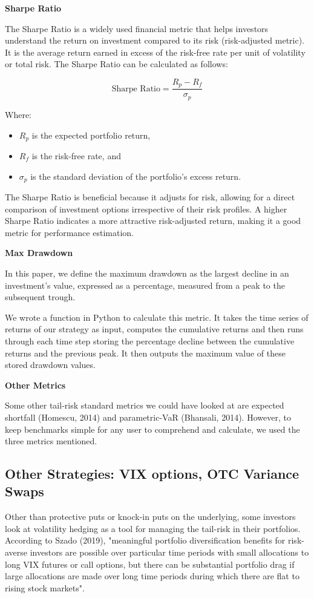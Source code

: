 \documentclass[12pt]{article}
\begin{document}
{{\textbf{Sharpe Ratio}

The Sharpe Ratio is a widely used financial metric that helps investors understand the return on investment compared to its risk (risk-adjusted metric). It is the average return earned in excess of the risk-free rate per unit of volatility or total risk. The Sharpe Ratio can be calculated as follows:

\[
\text{Sharpe Ratio} = \frac{R_p - R_f}{\sigma_p}
\]

Where:
\begin{itemize}
\item $R_p$ is the expected portfolio return,
\item $R_f$ is the risk-free rate, and
\item $\sigma_p$ is the standard deviation of the portfolio's excess return.
\end{itemize}

\qquad The Sharpe Ratio is beneficial because it adjusts for risk, allowing for a direct comparison of investment options irrespective of their risk profiles. A higher Sharpe Ratio indicates a more attractive risk-adjusted return, making it a good metric for performance estimation.

\textbf{Max Drawdown}

In this paper, we define the maximum drawdown as the largest decline in an investment's value, expressed as a percentage, measured from a peak to the subsequent trough.

We wrote a function in Python to calculate this metric. It takes the time series of returns of our strategy as input, computes the cumulative returns and then runs through each time step storing the percentage decline between the cumulative returns and the previous peak. It then outputs the maximum value of these stored drawdown values.

\textbf{Other Metrics}

Some other tail-risk standard metrics we could have looked at are expected shortfall (Homescu, 2014) and parametric-VaR (Bhansali, 2014). However, to keep benchmarks simple for any user to comprehend and calculate, we used the three metrics mentioned.

\subsection{Other Strategies: VIX options, OTC Variance Swaps}

\qquad Other than protective puts or knock-in puts on the underlying, some investors look at volatility hedging as a tool for managing the tail-risk in their portfolios. According to Szado (2019), "meaningful portfolio diversification benefits for risk-averse investors are possible over particular time periods with small allocations to long VIX futures or call options, but there can be substantial portfolio drag if large allocations are made over long time periods during which there are flat to rising stock markets". 

}}
\end{document}
